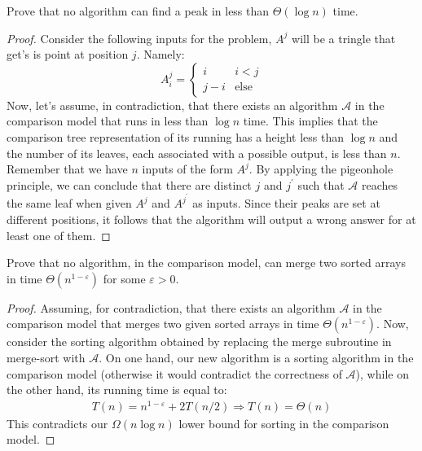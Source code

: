 \begin{example}
  Prove that no algorithm can find a peak in less than $\Theta\left( \log n \right)$ time.
\end{example}
\begin{proof}
  Consider the following inputs for the problem, $A^{j}$ will be a tringle that get's is point at position $j$. Namely:  
  \begin{equation*}
      A^{j}_{i} = \begin{cases}
        i & i < j \\
        j - i & \text{else}
      \end{cases}
  \end{equation*} 
  Now, let's assume, in contradiction, that there exists an algorithm $\mathcal{A}$ in the comparison model that runs in less than $\log n$ time. This implies that the comparison tree representation of its running has a height less than $\log n$ and the number of its leaves, each associated with a possible output, is less than $n$. Remember that we have $n$ inputs of the form $A^{j}$. By applying the pigeonhole principle, we can conclude that there are distinct $j$ and $j^{\prime}$ such that $\mathcal{A}$ reaches the same leaf when given $A^{j}$ and $A^{j^{\prime}}$ as inputs. Since their peaks are set at different positions, it follows that the algorithm will output a wrong answer for at least one of them.
\end{proof}

\begin{example}
  Prove that no algorithm, in the comparison model, can merge two sorted arrays in time $\Theta(n^{1-\varepsilon})$ for some $\varepsilon>0$.
\end{example}
\begin{proof}
 Assuming, for contradiction, that there exists an algorithm $\mathcal{A}$ in the comparison model that merges two given sorted arrays in time $\Theta\left( n^{1-\varepsilon} \right)$. Now, consider the sorting algorithm obtained by replacing the merge subroutine in merge-sort with $\mathcal{A}$. On one hand, our new algorithm is a sorting algorithm in the comparison model (otherwise it would contradict the correctness of $\mathcal{A}$), while on the other hand, its running time is equal to:
  \begin{equation*}
    \begin{split}
      T(n) = n^{1-\varepsilon} + 2T(n/2) \Rightarrow T(n) = \Theta(n)
    \end{split}
  \end{equation*}
  This contradicts our $\Omega(n\log n)$ lower bound for sorting in the comparison model.
\end{proof}


